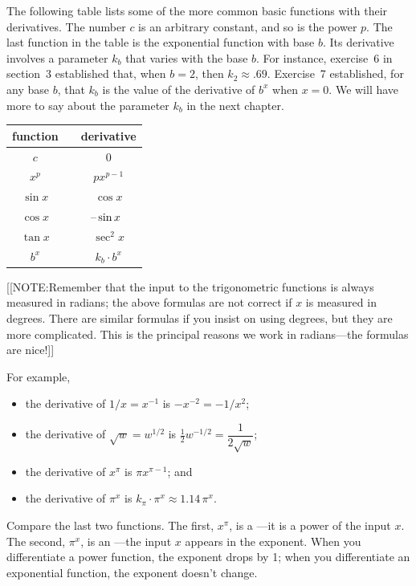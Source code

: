 The following table lists some of the more common basic functions with
their derivatives.  The number $c$ is an arbitrary constant, and so is
the power $p$.  The last function in the table is the exponential
function with base $b$.  Its derivative involves a parameter $k_b$
that varies with the base $b$.  For instance, exercise~6 in section~3
established that, when $b = 2$, then $k_2 \approx .69$.  Exercise~7
established, for any base $b$, that $k_b$ is the value of the
derivative of $b^x$ when $x = 0$.  We will have more to say about the
parameter $k_b$ in the next chapter.\label{basic derivs}
\begin{center}


\begin{tabular}{ccc}
	function & \qquad & derivative   \\[2pt] \hline 
	$c$        &\rule{0pt}{16pt} & 0  \\ 
	$x^p$ & \rule{0pt}{14pt} & $px^{p-1}$ \\ [1pt]
	$\sin{x}$  & & $\cos{x}$   \\ [1pt]
	$\cos{x}$  & & $\makebox[0pt][r]{--}\sin{x}
		\makebox[0pt][l]{}$  \\ [1pt]
	$\tan{x}$  & & $\sec^2{x}$   \\ [1pt]
	$b^x$      & & $k_b \cdot b^x$
\end{tabular}
\end{center}
[[NOTE:Remember that the input to the trigonometric functions is
  always measured in radians; the above formulas are not correct if
  $x$ is measured in degrees.  There are similar formulas if you
  insist on using degrees, but they are more complicated.  This is the
  principal reasons we work in radians---the formulas are nice!]]


For example, 
\begin{itemize}
\item the derivative of  $1/x = x^{-1}$  is
$-x^{-2}=-1/x^{2}$;
\item  the derivative of $\sqrt{w} = w^{1/2}$ is 
$\tfrac{1}{2}w^{-1/2} = \dfrac{1}{\displaystyle 2 \sqrt{w}}$; 
\item the derivative of  $x^{\pi}$ is $\pi x^{\pi - 1}$; and
\item the derivative of $\pi^x$ is $k_{\pi}\cdot\pi^x \approx 1.14\,\pi^x$.
\end{itemize}
Compare the last two functions.  The first, $x^{\pi}\!$, is a
---it is a power of the
input $x$.  The second, $\pi^x\!$, is an ---the input $x$ appears in the
exponent.  When you differentiate a power function, the exponent drops
by 1; when you differentiate an exponential function, the exponent
doesn't change.


